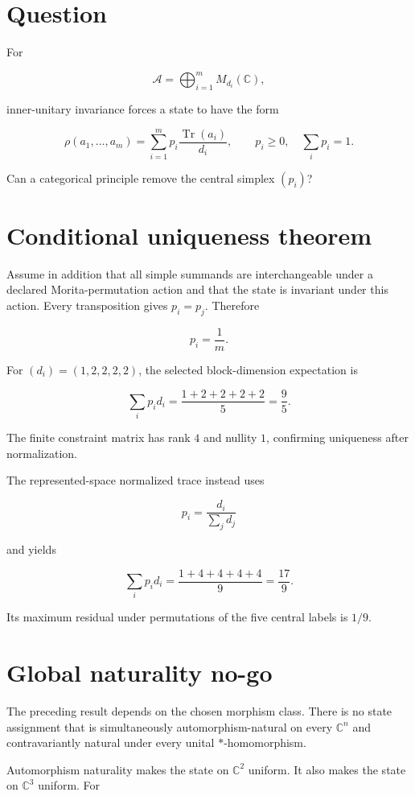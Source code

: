 \documentclass[11pt,a4paper,openany]{report}
\begin{document}
\section{Question}

For

\[
\mathcal A=\bigoplus_{i=1}^mM_{d_i}(\mathbb C),
\]

inner-unitary invariance forces a state to have the form

\[
\rho(a_1,\ldots,a_m)
=
\sum_{i=1}^m p_i\frac{\operatorname{Tr}(a_i)}{d_i},
\qquad
p_i\ge0,
\quad
\sum_i p_i=1.
\]

Can a categorical principle remove the central simplex \((p_i)\)?

\section{Conditional uniqueness theorem}

Assume in addition that all simple summands are interchangeable under a declared Morita-permutation action and that the state is invariant under this action. Every transposition gives \(p_i=p_j\). Therefore

\[
p_i=\frac1m.
\]

For \((d_i)=(1,2,2,2,2)\), the selected block-dimension expectation is

\[
\sum_i p_id_i
=
\frac{1+2+2+2+2}{5}
=
\frac95.
\]

The finite constraint matrix has rank \(4\) and nullity \(1\), confirming uniqueness after normalization.

The represented-space normalized trace instead uses

\[
p_i=\frac{d_i}{\sum_jd_j}
\]

and yields

\[
\sum_i p_id_i
=
\frac{1+4+4+4+4}{9}
=
\frac{17}{9}.
\]

Its maximum residual under permutations of the five central labels is \(1/9\).

\section{Global naturality no-go}

The preceding result depends on the chosen morphism class. There is no state assignment that is simultaneously automorphism-natural on every \(\mathbb C^n\) and contravariantly natural under every unital \(*\)-homomorphism.

Automorphism naturality makes the state on \(\mathbb C^2\) uniform. It also makes the state on \(\mathbb C^3\) uniform. For
\end{document}
